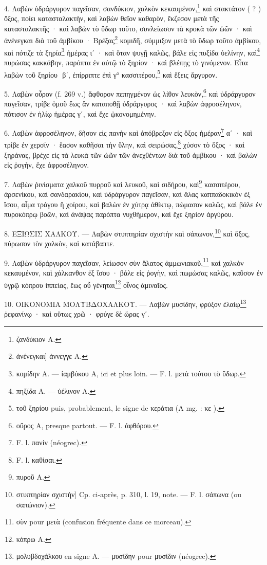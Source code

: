 \documentclass[a4paper, 11pt, oneside, polutonikogreek, french]{article}
\newcommand*\svgC{}
\newcommand*\svgD{}
\begin{document}
4. Λαβὼν ὑδράργυρον παγεῖσαν, σανδύκιον, χαλκὸν κεκαυμένον,\footnote{ζανδύκιον A.} καὶ στακτάτον ( ? ) ὄξος, ποίει κατασταλακτὴν, καὶ λαβὼν θεῖον καθαρὸν, ἔκζεσον μετὰ τῆς κατασταλακτῆς · καὶ λαβὼν τὸ ὕδωρ τοῦτο, συνλείωσον τὰ κροκὰ τῶν ὠῶν · καὶ ἀνένεγκαι διὰ τοῦ ἀμβίκου · Βρέξας\footnote{ἀνένεγκαι] ἀννεγγε A.} κομιδῆ, σύμμιξον μετὰ τὸ ὕδωρ τοῦτο ἀμβίκου, καὶ πότιζε τὰ ξηρία\footnote{κομίδην A. --- ἰαμβύκου A, ici et plus loin. --- F. l. μετὰ τούτου τὸ ὕδωρ.} ἡμέρας ιʹ · καὶ ὅταν ψυγῇ καλῶς, βάλε εἰς πυξίδα ὑελίνην, καὶ\footnote{πηξίδα A. --- ὑέλινον A.} πυρώσας κακκάβην, παρόπτα ἐν αὐτῷ τὸ ξηρίον · καὶ βλέπῃς τὸ γινόμενον. Εἶτα λαβὼν τοῦ ξηρίου $\svgC$ βʹ, ἐπίρριπτε ἐπὶ γ° κασσιτέρου,\footnote{τοῦ ξηρίου puis, probablement, le signe de κεράτια (A mg. : κε $\svgD$).} καὶ ἕξεις ἄργυρον.

5. Λαβὼν οὖρον (f. 269 v.) ἄφθορον πεπηγμένον ὡς λίθον λευκὸν,\footnote{οὔρος A, presque partout. --- F. l. ἀφθόρου.} καὶ ὑδράργυρον παγεῖσαν, τρίβε ὁμοῦ ἕως ἂν καταποθῇ ὑδράργυρος · καὶ λαβὼν ἀφροσέληνον, πότισον ἐν ἡλίῳ ἡμέρας γʹ, καὶ ἔχε ᾠκονομημένην.

6. Λαβὼν ἀφροσέληνον, δῆσον εἰς πανὴν καὶ ἀπόβρεξον εἰς ὄξος ἡμέραν\footnote{F. l. πανίν (néogrec).} αʹ · καὶ τρίβε ἐν χερσίν · ἔασον καθῆσαι τὴν ὕλην, καὶ σειρώσας,\footnote{F. l. καθίσαι.} χύσον τὸ ὄξος · καὶ ξηράνας, βρέχε εἰς τὰ λευκὰ τῶν ὠῶν τῶν ἀνεχθέντων διὰ τοῦ ἀμβίκου · καὶ βαλὼν εἰς ῥογὴν, ἔχε ἀφροσέληνον.

7. Λαβὼν ῥινίσματα χαλκοῦ πυρροῦ καὶ λευκοῦ, καὶ σιδήρου, καὶ\footnote{πυροῦ A.} κασσιτέρου, ἀρσενίκου, καὶ σανδαρακίου, καὶ ὑδράργυρον παγεῖσαν, καὶ ἅλας καππαδοκικὸν ἐξ ἴσου, αἷμα τράγου ἢ χοίρου, καὶ βαλὼν ἐν χύτρᾳ ἀθίκτῳ, πώμασον καλῶς, καὶ βάλε ἐν πυροκόπρῳ βοῶν, καὶ ἀνάψας παρόπτα νυχθήμερον, καὶ ἔχε ξηρίον ἀργύρου.

8. ΕΞΙΩΣΙΣ ΧΑΛΚΟΥ. --- Λαβὼν στυπτηρίαν σχιστὴν καὶ σάπωνον,\footnote{στυπτηρίαν σχιστὴν] Cp. ci-après, p. 310, l. 19, note. --- F. l. σάπωνα (ou σαπώνιον).} καὶ ὄξος, πύρωσον τὸν χαλκὸν, καὶ κατάβαπτε.

9. Λαβὼν ὑδράργυρον παγεῖσαν, λείωσον σὺν ἅλατος ἀμμωνιακοῦ,\footnote{σὺν pour μετὰ (confusion fréquente dans ce morceau).} καὶ χαλκὸν κεκαυμένον, καὶ χάλκανθον ἐξ ἴσου · βάλε εἰς ῥογὴν, καὶ πωμώσας καλῶς, καῦσον ἐν ὑγρῷ κόπρου ίππείας, ἕως οὗ γένηται\footnote{κόπρω A.} οἶνος ἀμιναῖος.

10. ΟΙΚΟΝΟΜΙΑ ΜΟΛΥΒΔΟΧΑΛΚΟΥ. --- Λαβὼν μυσίδην, φρύξον ἐλαίῳ\footnote{μολυβδοχάλκου en signe A. --- μυσίδην pour μυσίδιν (néogrec).} ῥεφανίνῳ · καὶ οὕτως χρῶ · φρύγε δὲ ὥρας γʹ.
\end{document}
